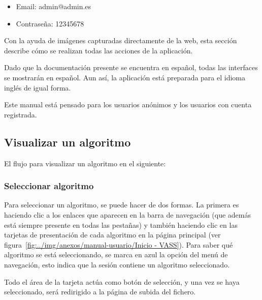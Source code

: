 \begin{tcolorbox}[colback=violet!5!white,colframe=violet!75!black,fontupper=\footnotesize,title=Credenciales administrador]
	\begin{itemize}
		\item Email: admin@admin.es
		\item Contraseña: 12345678
	\end{itemize}
\end{tcolorbox}

Con la ayuda de imágenes capturadas directamente de la web, esta sección
describe cómo se realizan todas las acciones de la aplicación.

Dado que la documentación presente se encuentra en español, todas las interfaces
se mostrarán en español. Aun así, la aplicación está preparada para el idioma
inglés de igual forma.

Este manual está pensado para los usuarios anónimos y los usuarios con cuenta
registrada.

\subsection{Visualizar un algoritmo}

El flujo para visualizar un algoritmo en el siguiente:


\subsubsection{Seleccionar algoritmo}
Para seleccionar un algoritmo, se puede hacer de dos formas. La primera es haciendo clic a los enlaces que aparecen en la barra de navegación (que además está siempre presente en todas las pestañas) y también haciendo clic en las tarjetas de presentación de cada algoritmo en la página principal (ver figura~\ref{fig:../img/anexos/manual-usuario/Inicio - VASS}).
Para saber qué algoritmo se está seleccionando, se marca en azul la opción del menú de navegación, esto indica que la sesión contiene un algoritmo seleccionado.


Todo el área de la tarjeta actúa como botón de selección, y una vez se haya seleccionado, será redirigido a la página de subida del fichero. 

